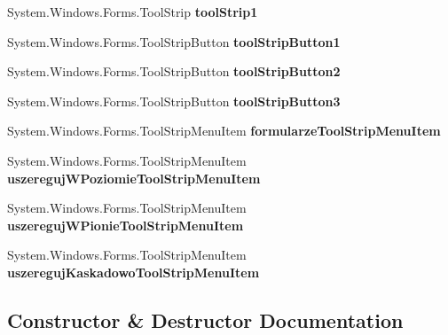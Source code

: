 \begin{DoxyCompactItemize}
System.\+Windows.\+Forms.\+Tool\+Strip {\bfseries tool\+Strip1}
\item 
\mbox{\label{class_statystyki___o_s_p_1_1_menu_glowne_a0b5d6f1b3d342a9dd2fc816b34ed2a98}} 
System.\+Windows.\+Forms.\+Tool\+Strip\+Button {\bfseries tool\+Strip\+Button1}
\item 
\mbox{\label{class_statystyki___o_s_p_1_1_menu_glowne_aeabf77280019f40c8bad2abe712b1303}} 
System.\+Windows.\+Forms.\+Tool\+Strip\+Button {\bfseries tool\+Strip\+Button2}
\item 
\mbox{\label{class_statystyki___o_s_p_1_1_menu_glowne_a0717932bc617a5b41bef30c90f0bb29a}} 
System.\+Windows.\+Forms.\+Tool\+Strip\+Button {\bfseries tool\+Strip\+Button3}
\item 
\mbox{\label{class_statystyki___o_s_p_1_1_menu_glowne_ad98300ff7bd43b659a54e6425b769756}} 
System.\+Windows.\+Forms.\+Tool\+Strip\+Menu\+Item {\bfseries formularze\+Tool\+Strip\+Menu\+Item}
\item 
\mbox{\label{class_statystyki___o_s_p_1_1_menu_glowne_a837a35867470b08df149580de40487cb}} 
System.\+Windows.\+Forms.\+Tool\+Strip\+Menu\+Item {\bfseries uszereguj\+W\+Poziomie\+Tool\+Strip\+Menu\+Item}
\item 
\mbox{\label{class_statystyki___o_s_p_1_1_menu_glowne_aabb94024b153f63b31ce4e7e3c123a45}} 
System.\+Windows.\+Forms.\+Tool\+Strip\+Menu\+Item {\bfseries uszereguj\+W\+Pionie\+Tool\+Strip\+Menu\+Item}
\item 
\mbox{\label{class_statystyki___o_s_p_1_1_menu_glowne_aed014ea9cc4d60417919816eb0b629c7}} 
System.\+Windows.\+Forms.\+Tool\+Strip\+Menu\+Item {\bfseries uszereguj\+Kaskadowo\+Tool\+Strip\+Menu\+Item}
\end{DoxyCompactItemize}


\subsection{Constructor \& Destructor Documentation}
\mbox{\label{class_statystyki___o_s_p_1_1_menu_glowne_ab8729000be3696d81762b1da2aa8dfb3}} 
